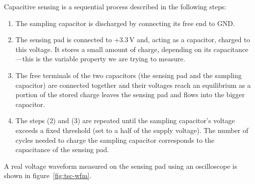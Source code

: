 \noindent
Capacitive sensing is a sequential process described in the following steps:

\begin{enumerate}
	\item The sampling capacitor is discharged by connecting its free end to \gls{GND}.
	\item The sensing pad is connected to +3.3\,V and, acting as a capacitor, charged to this voltage. It stores a small amount of charge, depending on its capacitance---this is the variable property we are trying to measure.
	\item The free terminals of the two capacitors (the sensing pad and the sampling capacitor) are connected together and their voltages reach an equilibrium as a portion of the stored charge leaves the sensing pad and flows into the bigger capacitor.
	\item The steps (2) and (3) are repeated until the sampling capacitor's voltage exceeds a fixed threshold (set to a half of the supply voltage). The number of cycles needed to charge the sampling capacitor corresponds to the capacitance of the sensing pad.
\end{enumerate}

\noindent
A real voltage waveform measured on the sensing pad using an oscilloscope is shown in figure~\ref{fig:tsc-wfm}.

